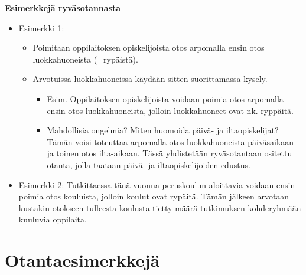 \documentclass[
]{book}
\providecommand{\tightlist}{%
  \setlength{\itemsep}{0pt}\setlength{\parskip}{0pt}}
\begin{document}
\begin{eblock}{}

\textbf{Esimerkkejä ryväsotannasta}

\begin{itemize}
\tightlist
\item
  Esimerkki 1:

  \begin{itemize}
  \tightlist
  \item
    Poimitaan oppilaitoksen opiskelijoista otos arpomalla ensin otos luokkahuoneista (=rypäistä).
  \item
    Arvotuissa luokkahuoneissa käydään sitten suorittamassa kysely.

    \begin{itemize}
    \tightlist
    \item
      Esim. Oppilaitoksen opiskelijoista voidaan poimia otos arpomalla ensin otos luokkahuoneista, jolloin luokkahuoneet ovat nk. ryppäitä.
    \item
      Mahdollisia ongelmia? Miten huomoida päivä- ja iltaopiskelijat? Tämän voisi toteuttaa arpomalla otos luokkahuoneista päiväsaikaan ja toinen otos ilta-aikaan. Tässä yhdistetään ryväsotantaan ositettu otanta, jolla taataan päivä- ja iltaopiskelijoiden edustus.
    \end{itemize}
  \end{itemize}
\item
  Esimerkki 2: Tutkittaessa tänä vuonna peruskoulun aloittavia voidaan ensin poimia otos kouluista, jolloin koulut ovat rypäitä. Tämän jälkeen arvotaan kustakin otokseen tulleesta koulusta tietty määrä tutkimuksen kohderyhmään kuuluvia oppilaita.
\end{itemize}

\end{eblock}

\hypertarget{alaluku56}{%
\section{Otantaesimerkkejä}\label{alaluku56}}
\end{document}
